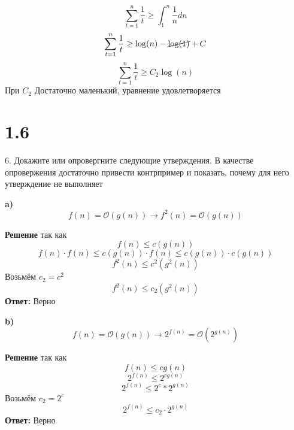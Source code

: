 \documentclass{article}
\begin{document}
\begin{equation*}
    \sum_{t=1}^{n}\dfrac{1}{t} \geq \int_{1}^{n} \dfrac{1}{n} dn
\end{equation*}
\begin{equation*}
    \sum_{t=1}^{n}\dfrac{1}{t} \geq \log (n) - \cancel{\log (1)} + C
\end{equation*}
\begin{equation*}
    \sum_{t=1}^{n}\dfrac{1}{t} \geq C_2\log (n)
\end{equation*}
При $C_2$ Достаточно маленький, уравнение удовлетворяется





\section*{1.6}
 6. Докажите или опровергните следующие утверждения. В качестве
опровержения достаточно привести контрпример и показать, почему для него утверждение не выполняет


\bigskip
\bigskip
\textbf{a)}
\begin{equation*}
    f(n) = \mathcal{O}(g(n)) \longrightarrow f^2(n) = \mathcal{O}(g(n))
\end{equation*}

\textbf{Решение}
так как
\begin{equation*}
    f(n) \leq c(g(n))
\end{equation*}
\begin{equation*}
    f(n) \cdot f(n) \leq c(g(n)) \cdot f(n) \leq c(g(n)) \cdot c(g(n))
\end{equation*}
\begin{equation*}
    f^2(n) \leq c^2(g^2(n))
\end{equation*}
Возьмём $c_2 = c^2$
\begin{equation*}
    f^2(n) \leq c_2(g^2(n))
\end{equation*}
\textbf{Ответ:} Верно



\bigskip
\bigskip
\textbf{b)}
\begin{equation*}
    f(n) = \mathcal{O}(g(n)) \longrightarrow 2^{f(n)} = \mathcal{O}(2^{g(n)})
\end{equation*}

\textbf{Решение}
так как
\begin{equation*}
    f(n) \leq cg(n)
\end{equation*}
\begin{equation*}
    2^{f(n)} \leq 2^{cg(n)}
\end{equation*}
\begin{equation*}
    2^{f(n)} \leq 2^c*2^{g(n)}
\end{equation*}
Возьмём $c_2 = 2^c$
\begin{equation*}
    2^{f(n)} \leq c_2 \cdot 2^{g(n)}
\end{equation*}
\textbf{Ответ:} Верно
\end{document}

